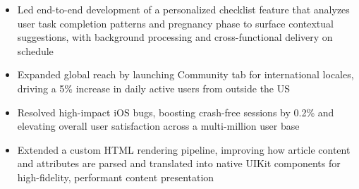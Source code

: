 \begin{itemize}
    \item Led end-to-end development of a personalized checklist feature that analyzes user task completion patterns and pregnancy phase to surface contextual suggestions, with background processing and cross-functional delivery on schedule
    \item Expanded global reach by launching Community tab for international locales, driving a 5\% increase in daily active users from outside the US
    \item Resolved high-impact iOS bugs, boosting crash-free sessions by 0.2\% and elevating overall user satisfaction across a multi-million user base
    \item Extended a custom HTML rendering pipeline, improving how article content and attributes are parsed and translated into native UIKit components for high-fidelity, performant content presentation
\end{itemize}
